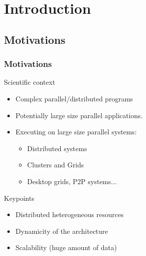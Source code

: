 
\section{Introduction}
\subsection{Motivations}
\frame
{
  \frametitle{Motivations}
\begin{block}{Scientific context}
\begin{itemize}
\item Complex parallel/distributed programs
\item Potentially large size parallel applications.
\item Executing on large size parallel systems:
\begin{itemize}
\item Distributed systems
\item Clusters and Grids 
\item  Desktop grids, P2P systems...
\end{itemize}
\end{itemize}
\end{block}
\begin{block}{Keypoints}
\begin{itemize}
\item Distributed heterogeneous resources
\item Dynamicity of the architecture
\item Scalability (huge amount of data)
\end{itemize}
\end{block}
}
